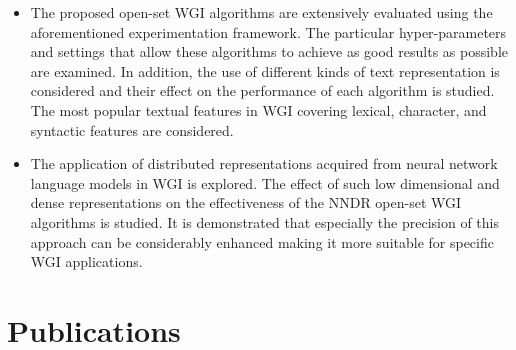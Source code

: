 \begin{itemize}
\begin{itemize}
\item The proposed open-set WGI algorithms are extensively evaluated using the aforementioned experimentation framework. The particular hyper-parameters and settings that allow these algorithms to achieve as good results as possible are examined. In addition, the use of different kinds of text representation is considered and their effect on the performance of each algorithm is studied. The most popular textual features in WGI covering lexical, character, and syntactic features are considered.
\item The application of distributed representations acquired from neural network language models in WGI is explored. The effect of such low dimensional and dense representations on the effectiveness of the NNDR open-set WGI algorithms is studied. It is demonstrated that especially the precision of this approach can be considerably enhanced making it more suitable for specific WGI applications.


\end{itemize}

\section{Publications}


\end{itemize}
